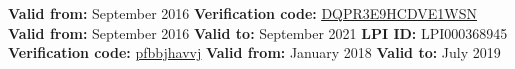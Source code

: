 %
%
%


\begin{certifications}
        {
            \textbf{Valid from:} September 2016
            \textbf{Verification code:} 
                \href{https://www.certmetrics.com/comptia/public/verification.aspx?code=DQPR3E9HCDVE1WSN}
                {\underline{DQPR3E9HCDVE1WSN}}
        }
        {
            \textbf{Valid from:} September 2016
            \textbf{Valid to:} September 2021
            \textbf{LPI ID:} LPI000368945
            \textbf{Verification code: }
                \href{https://cs.lpi.org/caf/Xamman/certification}
                {\underline{pfbbjhavvj}}
        }
        {
            \textbf{Valid from:} January 2018
            \textbf{Valid to:} July 2019
        }
\end{certifications}